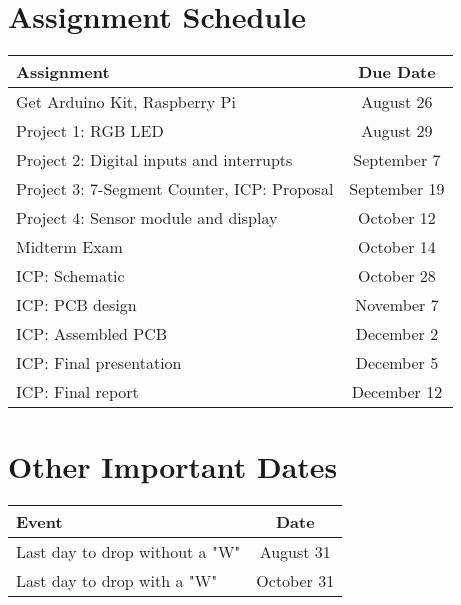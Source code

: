 \section*{Assignment Schedule} 
\begin{table*}[h!]
    \begin{tabular}{ l | c }
        \toprule
        Assignment & Due Date \\

        \midrule
        Get Arduino Kit, Raspberry Pi\footnotemark                  & August 26     \\
        Project 1: RGB LED                                          & August 29     \\
        Project 2: Digital inputs and interrupts                    & September 7   \\
        Project 3: 7-Segment Counter, ICP: Proposal\footnotemark[2] & September 19  \\
        Project 4: Sensor module and display                        & October 12     \\
        Midterm Exam                                                & October 14    \\
        ICP: Schematic                                              & October 28    \\
        ICP: PCB design                                             & November 7   \\
        ICP: Assembled PCB                                          & December 2   \\
        ICP: Final presentation                                     & December 5    \\
        ICP: Final report                                           & December 12   \\

        \bottomrule
    \end{tabular}
\end{table*}

\section*{Other Important Dates}

\begin{table*}[h!]
    \begin{tabular}{ l | c }
        \toprule
        Event & Date \\

        \midrule
        Last day to drop without a "W"  & August 31 \\
        Last day to drop with a "W"     & October 31 \\

        \bottomrule
    \end{tabular}
\end{table*}


